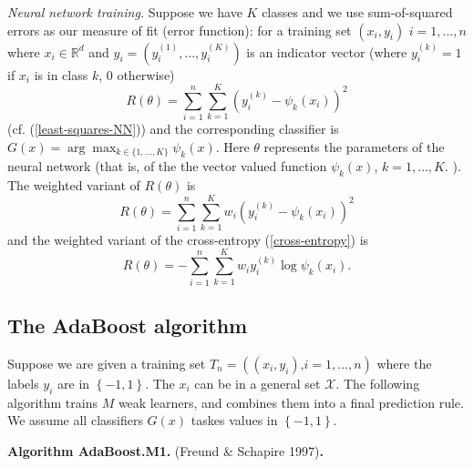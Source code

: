 \documentclass[11pt,twoside]{article}%
\theoremstyle{change}
\begin{document}
\textit{Neural network training.} Suppose we have $K$ classes and we use
sum-of-squared errors as our measure of fit (error function): for a training
set $(x_{i},y_{i})$ $i=1,\ldots,n$ where $x_{i}\in\mathbb{R}^{d}$ and
$y_{i}=(y_{i}^{(1)},\ldots,y_{i}^{(K)})$ is an indicator vector (where
$y_{i}^{(k)}=1$ if $x_{i}$ is in class $k$, $0$ otherwise)
\[
R(\theta)=\sum_{i=1}^{n}\sum_{k=1}^{K}\left(  y_{i}^{(k)}-\psi_{k}%
(x_{i})\right)  ^{2}%
\]
(cf. (\ref{least-squares-NN})) and the corresponding classifier is
$G(x)=\arg\max_{k\in\{1,\ldots,K\}}\psi_{k}(x)$. Here $\theta$ represents the
parameters of the neural network (that is, of the the vector valued function
$\psi_{k}(x)$, $k=1,\ldots,K.$ ). The weighted variant of $R(\theta)$ is
\[
R(\theta)=\sum_{i=1}^{n}\sum_{k=1}^{K}w_{i}\left(  y_{i}^{(k)}-\psi_{k}%
(x_{i})\right)  ^{2}%
\]
and the weighted variant of the cross-entropy (\ref{cross-entropy}) is
\[
R(\theta)=-\sum_{i=1}^{n}\sum_{k=1}^{K}w_{i}y_{i}^{(k)}\log\psi_{k}(x_{i}).
\]


\subsection{The AdaBoost algorithm}

Suppose we are given a training set $T_{n}=\left(  \left(  x_{i},y_{i}\right)
\text{,}i=1,\ldots,n\right)  $ where the labels $y_{i}$ are in $\left\{
-1,1\right\}  $. The $x_{i}$ can be in a general set $\mathcal{X}$. The
following algorithm trains $M$ weak learners, and combines them into a final
prediction rule. We assume all classifiers $G(x)$ taskes values in $\left\{
-1,1\right\}  $.

\bigskip

\textbf{Algorithm AdaBoost.M1. }(Freund \& Schapire 1997)\textbf{. }
\end{document}
